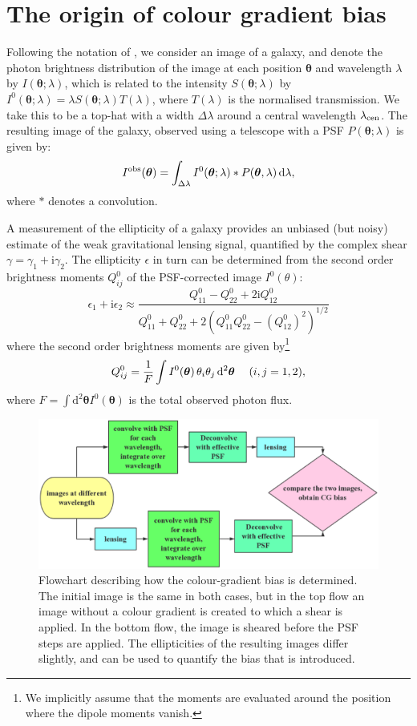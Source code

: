 \documentclass[useAMS,usenatbib]{mnras}
\renewcommand{\d}{\mathrm{d}}
\newcommand{\ii}{\mathrm{i}}
\newcommand{\be}{\begin{equation}}
\newcommand{\ee}{\end{equation}}
\def\elabel#1{\label{eq:#1}}
\begin{document}
\section{The origin of colour gradient bias}
\label{sec:concepts}

Following the notation of , we consider an image of a galaxy, and denote the photon brightness
distribution of the image at each position $\bm \theta$ and wavelength $\lambda$ by $I({\bm \theta};\lambda)$, which is related to the intensity $S({\bm\theta};\lambda)$ by $I^0({\bm\theta};\lambda)=\lambda S({\bm\theta};\lambda)
T(\lambda)$, where $T(\lambda)$ is the normalised transmission. We take this to be a top-hat with a
width $\Delta\lambda$ around a central wavelength $\lambda_{\rm cen}$. The resulting image of the galaxy, observed using a telescope with a PSF $P({\bm \theta};\lambda)$  is given by:
%
\be
I^{\rm obs}({\bm\theta}) = \int_{\Delta\lambda} I^0({\bm\theta}; \lambda) *
P({\bm \theta},\lambda)\, \d \lambda,
\label{eq:iobs}
\ee
%
where $*$ denotes a convolution.

A measurement of the ellipticity of a galaxy provides an unbiased (but noisy) estimate of the
weak gravitational lensing signal, quantified by the complex shear $\gamma=\gamma_1+\ii\gamma_2$.
The ellipticity $\epsilon$ in turn can be determined from the second order brightness moments $Q^0_{ij}$ of the PSF-corrected image $I^0(\theta)$:
%
\be
\epsilon_1+\ii \epsilon_2 \approx \frac{Q^0_{11} - Q^0_{22} + 2 \ii Q^0_{12} }
{Q^0_{11} + Q^0_{22} +2(Q^0_{11}Q^0_{22} - (Q^0_{12})^2)^{1/2}}
\elabel{mshear}
\ee
%
where the second order brightness moments are given by\footnote{We implicitly assume that the moments are evaluated around the position where the dipole moments vanish.}
%
\be
Q^0_{ij} = {1 \over F} \int  I^{0}({\bm \theta})\, \theta_i \theta_j \, \d^2 {\bm \theta} \quad\; (i,j=1,2),
\ee
%
where $F=\int \d^2{{\bm\theta}}  I^{0}({\bm\theta})$ is the total observed photon flux.

%
\begin{figure}
\includegraphics[width=13.5cm]{colourg.eps}
\caption{Flowchart describing how the colour-gradient bias is determined. The initial image
is the same in both cases, but in the top flow an image without a colour gradient is created
to which a shear is applied. In the bottom flow, the image is sheared before the PSF steps
are applied. The ellipticities of the resulting images differ slightly, and can be used to quantify
the bias that is introduced.}
\label{fig:flowchart}
\end{figure}
%
\end{document}
